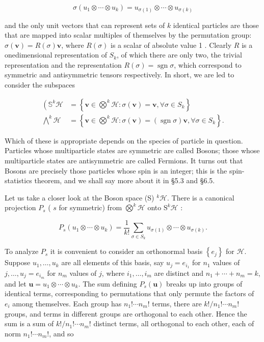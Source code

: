 \documentclass[10pt, letterpaper]{article}
\begin{document}
$$
\sigma\left(u_{1} \otimes \cdots \otimes u_{k}\right)=u_{\sigma(1)} \otimes \cdots \otimes u_{\sigma(k)}
$$

and the only unit vectors that can represent sets of $k$ identical particles are those that are mapped into scalar multiples of themselves by the permutation group: $\sigma(\mathbf{v})=R(\sigma) \mathbf{v}$, where $R(\sigma)$ is a scalar of absolute value 1 . Clearly $R$ is a onedimensional representation of $S_{k}$, of which there are only two, the trivial representation and the representation $R(\sigma)=\operatorname{sgn} \sigma$, which correspond to symmetric and antisymmetric tensors respectively. In short, we are led to consider the subspaces

$$
\begin{aligned}
\left(\mathbb{S}^{k} \mathcal{H}\right. & =\left\{\mathbf{v} \in \bigotimes^{k} \mathcal{H}: \sigma(\mathbf{v})=\mathbf{v}, \forall \sigma \in S_{k}\right\} \\
\bigwedge^{k} \mathcal{H} & =\left\{\mathbf{v} \in \bigotimes^{k} \mathcal{H}: \sigma(\mathbf{v})=(\operatorname{sgn} \sigma) \mathbf{v}, \forall \sigma \in S_{k}\right\} .
\end{aligned}
$$

Which of these is appropriate depends on the species of particle in question. Particles whose multiparticle states are symmetric are called Bosons; those whose multiparticle states are antisymmetric are called Fermions. It turns out that Bosons are precisely those particles whose spin is an integer; this is the spin-statistics theorem, and we shall say more about it in §5.3 and §6.5.

Let us take a closer look at the Boson space (S) ${ }^{k} \mathcal{H}$. There is a canonical projection $P_{s}$ ( $s$ for symmetric) from $\bigotimes^{k} \mathcal{H}$ onto $\mathrm{S}^{k} \mathcal{H}$ :

$$
P_{s}\left(u_{1} \otimes \cdots \otimes u_{k}\right)=\frac{1}{k!} \sum_{\sigma \in S_{k}} u_{\sigma(1)} \otimes \cdots \otimes u_{\sigma(k)} .
$$

To analyze $P_{s}$ it is convenient to consider an orthonormal basis $\left\{e_{j}\right\}$ for $\mathcal{H}$. Suppose $u_{1}, \ldots, u_{k}$ are all elements of this basis, say $u_{j}=e_{i_{1}}$ for $n_{1}$ values of $j, \ldots, u_{j}=e_{i_{m}}$ for $n_{m}$ values of $j$, where $i_{1}, \ldots, i_{m}$ are distinct and $n_{1}+\cdots+n_{m}=k$, and let $\mathbf{u}=u_{1} \otimes \cdots \otimes u_{k}$. The sum defining $P_{s}(\mathbf{u})$ breaks up into groups of identical terms, corresponding to permutations that only permute the factors of $e_{i}$ among themselves. Each group has $n_{1}!\cdots n_{m}!$ terms, there are $k!/ n_{1}!\cdots n_{m}!$ groups, and terms in different groups are orthogonal to each other. Hence the sum is a sum of $k!/ n_{1}!\cdots n_{m}!$ distinct terms, all orthogonal to each other, each of norm $n_{1}!\cdots n_{m}!$, and so
\end{document}
